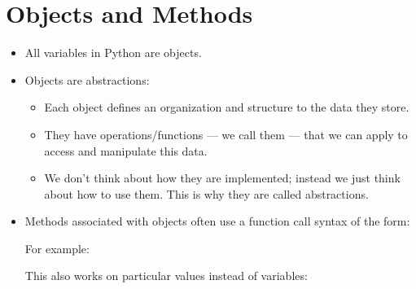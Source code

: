 \documentclass[letterpaper,10pt,english]{sphinxmanual}
\begin{document}
\section{Objects and Methods}
\label{\detokenize{lecture_notes/lec04_modules_functions1:objects-and-methods}}\begin{itemize}
\item {} 
All variables in Python are objects.

\item {} 
Objects are abstractions:
\begin{itemize}
\item {} 
Each object defines an organization and structure to the data they
store.

\item {} 
They have operations/functions — we call them  —
that we can apply to access and manipulate this data.

\item {} 
We don’t think about how they are implemented; instead we just
think about how to use them.  This is why they are called
abstractions.

\end{itemize}

\item {} 
Methods associated with objects often use a function call syntax of
the form:

\begin{sphinxVerbatim}[commandchars=\\\{\}]
\end{sphinxVerbatim}

For example:

\begin{sphinxVerbatim}[commandchars=\\\{\}]
  
 
\end{sphinxVerbatim}

This also works on particular values instead of variables:

\begin{sphinxVerbatim}[commandchars=\\\{\}]
\end{sphinxVerbatim}


\end{itemize}
\end{document}

